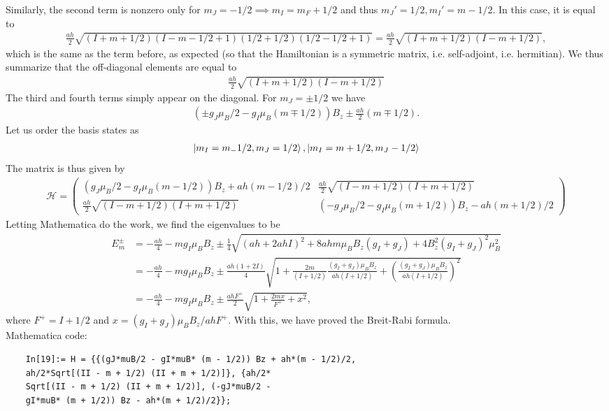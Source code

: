 \documentclass{article}
\theoremstyle{definition}
\newcommand{\ham}{\mathcal{H}}
\newcommand{\f}[2]{\frac{#1}{#2}}
\newcommand{\lp}{\left(}
\newcommand{\rp}{\right)}
\begin{document}
\begin{enumerate}[label=(\alph*)]
	Similarly, the second term is nonzero only for $m_J = -1/2 \implies m_I = m_F+1/2$ and thus $m_J'=1/2, m_I' = m-1/2$. In this case, it is equal to 
	\begin{align*}
	\f{ah}{2}\sqrt{(I+m+1/2)(I-m-1/2+1)(1/2+1/2)(1/2-1/2+1)} = \f{ah}{2}\sqrt{(I+m+1/2)(I-m+1/2)},
	\end{align*}
	which is the same as the term before, as expected (so that the Hamiltonian is a symmetric matrix, i.e. self-adjoint, i.e. hermitian).  We thus summarize that the off-diagonal elements are equal to 
	\begin{align*}
	\f{ah}{2}\sqrt{(I+m+1/2)(I-m+1/2)}
	\end{align*}
	The third and fourth terms simply appear on the diagonal. For $m_J = \pm 1/2$ we have
	\begin{align*}
	(\pm g_J \mu_B/2  - g_I \mu_B (m\mp 1/2)) B_z \pm \f{ah}{2}( m \mp 1/2 ). 
	\end{align*}
	Let us order the basis states as
	\begin{align*}
	\ket{m_I=m_-1/2, m_J=1/2}, \ket{m_I=m+1/2, m_J -1/2}
	\end{align*}
	The matrix is thus given by 
	\begin{align*}
	\ham = 
	\begin{pmatrix}
	(g_J \mu_B/2  - g_I \mu_B (m- 1/2)) B_z + ah(m-1/2)/2 & \f{ah}{2}\sqrt{(I-m+1/2)(I+m+1/2)}\\
	\f{ah}{2}\sqrt{(I-m+1/2)(I+m+1/2)} & (-g_J \mu_B/2  - g_I \mu_B (m+ 1/2)) B_z - ah(m+1/2)/2 
	\end{pmatrix} 
	\end{align*}
	Letting Mathematica do the work, we find the eigenvalues to be 
	\begin{align*}
	E_m^\pm &= -\f{ah}{4} - mg_I \mu_B B_z \pm \f{1}{4}\sqrt{(ah+2ahI)^2 + 8ahm\mu_B B_z(g_I+g_J) + 4B_z^2(g_I+g_J)^2\mu_B^2}\\
	&= -\f{ah}{4} - mg_I \mu_B B_z \pm \f{ah(1+2I)}{4}\sqrt{1+\f{2m}{(I+1/2)}\f{(g_I+g_J)\mu_B B_z}{ah(I+1/2)} + \lp \f{(g_I+g_J)\mu_B B_z}{ah(I+1/2)}   \rp^2}\\
	&= -\f{ah}{4}-mg_I \mu_B B_z \pm \f{ah F^+}{2}\sqrt{1+\f{2mx}{F^+}+x^2},
	\end{align*}
	where $F^+ = I+1/2$ and $x = (g_I+g_J)\mu_B B_z/ahF^+$. With this, we have proved the Breit-Rabi formula. \\
	
	
	Mathematica code:
	\begin{lstlisting}
	In[19]:= H = {{(gJ*muB/2 - gI*muB* (m - 1/2)) Bz + ah*(m - 1/2)/2, 
	ah/2*Sqrt[(II - m + 1/2) (II + m + 1/2)]}, {ah/2*
	Sqrt[(II - m + 1/2) (II + m + 1/2)], (-gJ*muB/2 - 
	gI*muB* (m + 1/2)) Bz - ah*(m + 1/2)/2}};
	

\end{lstlisting}
\end{enumerate}
\end{document}
